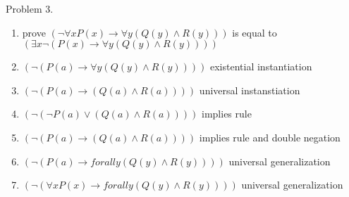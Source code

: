 \documentclass[10pt]{article}
\begin{document}
\item Problem 3.
\begin{enumerate}
	\item prove $( \neg \forall x P(x) \longrightarrow \forall y (Q(y) \wedge R(y)) )$ is equal to $( \exists x \neg( P(x) \longrightarrow \forall y (Q(y) \wedge R(y))) )$
	\item $( \neg( P(a) \longrightarrow \forall y (Q(y) \wedge R(y))) )$ existential instantiation 
	\item $( \neg( P(a) \longrightarrow (Q(a) \wedge R(a))) )$ universal instanstiation
	\item $(  \neg( \neg P(a) \vee (Q(a) \wedge R(a)) ) )$ implies rule
	\item $( \neg (P(a) \longrightarrow (Q(a) \wedge R(a))) )$ implies rule and double negation
	\item $( \neg (P(a) \longrightarrow forall y (Q(y) \wedge R(y))) )$ universal generalization 
	\item $(  \neg ( \forall x P(x) \longrightarrow forall y (Q(y) \wedge R(y))) )$ universal generalization  
\end{enumerate}
\end{document}
